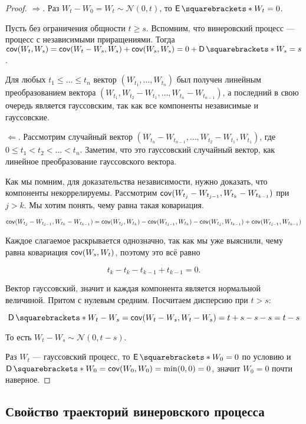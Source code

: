 \begin{proof}
  $\boxed{\Longrightarrow}$. Раз $W_t - W_0 = W_t \sim \mathcal{N}(0, t)$, то
  $\E{W_t} = 0$.

  Пусть без ограничения общности $t \geq s$. Вспомним, что винеровский процесс ---
  процесс с независимыми приращениями. Тогда $\cov(W_t, W_s) = 
  \cov(W_t - W_s, W_s) + \cov(W_s, W_s) = 0 + \D{W_s} = s$.

  Для любых $t_1 \leq \ldots \leq t_n$ вектор $(W_{t_1}, \ldots, W_{t_n})$ был получен
  линейным преобразованием вектора $(W_{t_1}, W_{t_2} - W_{t_1}, \ldots, W_{t_n} - W_{t_{n - 1}})$,
  а последний в свою очередь является гауссовским, так как все компоненты независимые
  и гауссовские.

  $\boxed{\Longleftarrow}$. Рассмотрим случайный вектор $(W_{t_n} - W_{t_{n - 1}}, \ldots,
  W_{t_2} - W_{t_1}, W_{t_1})$, где $0 \leq t_1 < t_2 < \ldots < t_n$. Заметим, что
  это гауссовский случайный вектор, как линейное преобразование гауссовского вектора.

  Как мы помним, для доказательства независимости, нужно доказать, что компоненты
  некоррелируемы. Рассмотрим $\operatorname{\mathsf{cov}}(W_{t_j} - W_{t_{j - 1}}, W_{t_k} - W_{t_{k - 1}})$
  при $j > k$. Мы хотим понять, чему равна такая ковариация.

  \[
    \operatorname{\mathsf{cov}}(W_{t_j} - W_{t_{j - 1}}, W_{t_k} - W_{t_{k - 1}}) = 
    \operatorname{\mathsf{cov}}(W_{t_j}, W_{t_k}) - \operatorname{\mathsf{cov}}(W_{t_{j - 1}}, W_{t_k}) -
    \operatorname{\mathsf{cov}}(W_{t_j}, W_{t_{k - 1}}) + \operatorname{\mathsf{cov}}(W_{t_{j - 1}}, W_{t_{k - 1}})
  \]

  Каждое слагаемое раскрывается однозначно, так как мы уже выяснили, чему равна
  ковариация $\operatorname{\mathsf{cov}}(W_s, W_t)$, поэтому это всё равно

  \[
    t_k - t_k - t_{k - 1} + t_{k - 1} = 0.
  \]

  Вектор гауссовский, значит и каждая компонента является нормальной величиной.
  Притом с нулевым средним. Посчитаем дисперсию при $t > s$:

  \[
    \D{W_t - W_s} = \cov(W_t - W_s, W_t - W_s) = t + s - s - s = t - s
  \]

  То есть $W_t - W_s \sim \mathcal{N}(0, t - s)$.

  Раз $W_t$ --- гауссовский процесс, то $\E{W_0} = 0$ по условию и $\D{W_0} = 
  \cov(W_0, W_0) = \min(0, 0) = 0$, значит $W_0 = 0$ почти наверное.
\end{proof}

\subsection{Свойство траекторий винеровского процесса}

